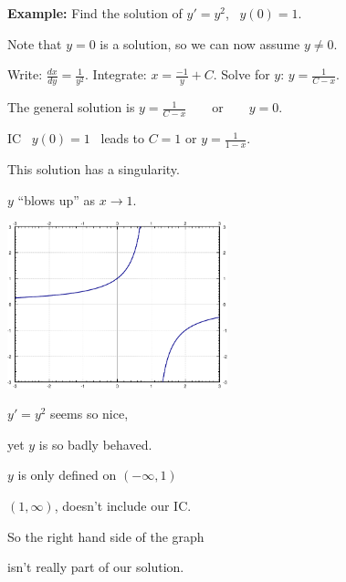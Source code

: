 \documentclass[10pt,aspectratio=169]{beamer}
\begin{document}
\begin{frame}
\textbf{Example:}
Find the solution of
$y' = y^2$,~ $y(0)=1$.

\medskip
\pause

Note that $y=0$ is a solution, so we can now assume $y \not= 0$.

\medskip
\pause

Write:
\quad
$\displaystyle
\frac{dx}{dy} = \frac{1}{y^2}$.
\qquad
\pause
Integrate:
\quad
$\displaystyle
x = \frac{-1}{y} + C$.
\qquad
\pause
Solve for $y$:
\quad
$\displaystyle
y = \frac{1}{C-x}$.

\medskip
\pause

The general solution is
\quad
$\displaystyle
y = \frac{1}{C-x} \qquad \text{or} \qquad y = 0$.

\medskip
\pause

IC ~$y(0)=1$~ leads 
to $C=1$ or $y = \frac{1}{1-x}$.

\medskip
\pause

This solution has a singularity.

\medskip
\pause

$y$ ``blows up'' as $x\to 1$.

\vspace*{-0.7in}
\hspace*{2.5in}%
\includegraphics[height=1.9in]{../figures/1over1mx}

\vspace*{-1.15in}
\pause

$y'=y^2$ seems so nice,

yet $y$ is so badly behaved.

\medskip
\pause

$y$ is only defined on $(-\infty,1)$

\medskip
\pause

$(1,\infty)$, doesn't include our
IC.

\medskip
\pause

So the right hand side of the graph

isn't really part of our solution.
\end{frame}
\end{document}
